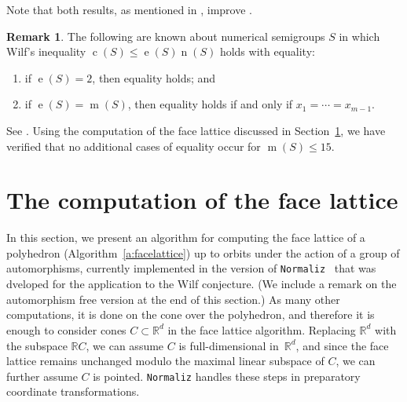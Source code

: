 \documentclass[12pt]{amsart}
\theoremstyle{definition}
\newtheorem{remark}[thm]{Remark}
\numberwithin{equation}{section}
\newcommand{\ring}[1]{\ensuremath{\mathbb{#1}}}
\renewcommand\>{\rangle}
\newcommand\<{\langle}
\newcommand\0{\mathbf{0}}
\newcommand\RR{\ring{R}}
\begin{document}
Note that both results, as mentioned in \cite{wilf-survey}, improve \cite[Thoerem 4.9]{md}.

\begin{remark}\label{r:wilfequality}
The following are known about numerical semigroups $S$ in which Wilf's inequality $\operatorname{c}(S) \le \operatorname{e}(S)\operatorname{n}(S)$ holds with equality:
\begin{enumerate}[(1)]
\item if $\operatorname{e}(S) = 2$, then equality holds; and
\item if $\operatorname{e}(S) = \operatorname{m}(S)$, then equality holds if and only if $x_1 = \cdots = x_{m-1}$.
\end{enumerate}
See \cite[Section 2.3]{wilf-survey}.  Using the computation of the face lattice discussed in Section~\ref{sec:facelattice}, we have verified that no additional cases of equality occur for $\operatorname{m}(S)\le 15$.
\end{remark}


\section{The computation of the face lattice}%
\label{sec:facelattice}%

In this section, we present an algorithm for computing the face lattice of a polyhedron (Algorithm~\ref{a:facelattice}) up to orbits under the action of a group of automorphisms, currently implemented in the version of \texttt{Normaliz}~\cite{Normaliz} that was dveloped for the application to the Wilf conjecture.  (We include a remark on the automorphism free version at the end of this section.) As many other computations, it is done on the cone over the polyhedron, and therefore it is enough to consider cones $C \subset \RR^d$ in the face lattice algorithm.  Replacing $\RR^d$ with the subspace $\RR C$, we can assume $C$ is full-dimensional in~$\RR^d$, and since the face lattice remains unchanged modulo the maximal linear subspace of $C$, we can further assume $C$ is pointed.  \texttt{Normaliz} handles these steps in preparatory coordinate transformations.  
\end{document}
